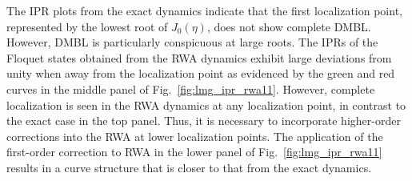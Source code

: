 \documentclass[%
reprint,
superscriptaddress,
amsmath,amssymb,
aps,
prb,
showkeys,
]{revtex4-2}
\begin{document}
The IPR plots from the exact dynamics indicate that the first localization point, represented by the lowest  root of $J_0(\eta)$, does not show complete DMBL. However, DMBL is particularly conspicuous at large roots. The IPRs of the Floquet states obtained from the RWA dynamics exhibit large deviations from unity when away from the localization point as evidenced by the green and red curves in the middle panel of Fig.~\ref{fig:lmg_ipr_rwa11}. However, complete localization is seen in the RWA dynamics at any localization point, in contrast to the exact case in the top panel. Thus, it is necessary to incorporate  higher-order corrections into the RWA at lower localization points. The application of the first-order correction to RWA in the lower panel of Fig.~\ref{fig:lmg_ipr_rwa11} results in a curve structure that is closer to that from the exact dynamics.
\end{document}
